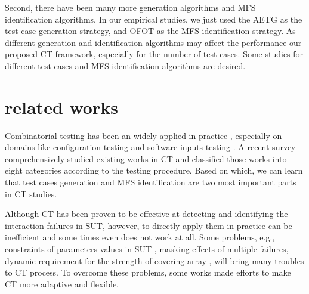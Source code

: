 \documentclass{sig-alternate}
\begin{document}
Second, there have been many more generation algorithms and MFS identification algorithms. In our empirical studies, we just used the AETG \cite{cohen1997aetg} as the test case generation strategy, and OFOT \cite{nie2011minimal} as the MFS identification strategy. As different generation and identification algorithms may affect the performance our proposed CT framework, especially for the number of test cases.
Some studies for different test cases and MFS identification algorithms are desired.



\section{related works}
Combinatorial testing has been an widely applied in practice \cite{kuhn2010practical}, especially on domains like configuration testing \cite{yilmaz2006covering,cohen2006testing,qu2008configuration,fouche2009incremental} and software inputs testing \cite{cohen1997aetg,borazjany2012combinatorial,ghandehari2013applying,garn2014eris}. A recent survey \cite{nie2011survey} comprehensively studied existing works in CT and classified those works into eight categories according to the testing procedure. Based on which, we can learn that test cases generation and MFS identification are two most important parts in CT studies.

Although CT has been proven to be effective at detecting and identifying the interaction failures in SUT, however, to directly apply them in practice can be inefficient and some times even does not work at all. Some problems, e.g., constraints of parameters values in SUT \cite{cohen2007exploiting,cohen2008constructing}, masking effects of multiple failures\cite{dumlu2011feedback,yilmaz2013reducing}, dynamic requirement for the strength of covering array \cite{fouche2009incremental}, will bring many troubles to CT process. To overcome these problems, some works made efforts to make CT more adaptive and flexible.
\end{document}
